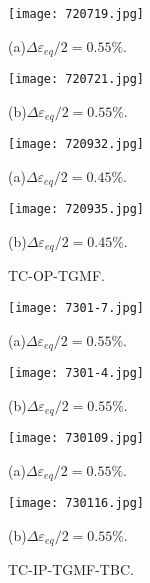 \begin{figure}
  \begin{minipage}[t]{0.5\linewidth}
  \nonumber
    \centering
    \texttt{[image: 720719.jpg]}
    \centerline{(a)$\Delta \varepsilon_{eq}/2=0.55\%$.}
  \end{minipage}%
  \begin{minipage}[t]{0.5\linewidth}
    \centering
    \texttt{[image: 720721.jpg]}
    \centerline{(b)$\Delta \varepsilon_{eq}/2=0.55\%$.}
  \end{minipage}
  
  \begin{minipage}[t]{0.5\linewidth}
  \nonumber
    \centering
    \texttt{[image: 720932.jpg]}
    \centerline{(a)$\Delta \varepsilon_{eq}/2=0.45\%$.}
  \end{minipage}%
  \begin{minipage}[t]{0.5\linewidth}
    \centering
    \texttt{[image: 720935.jpg]}
    \centerline{(b)$\Delta \varepsilon_{eq}/2=0.45\%$.}
  \end{minipage}
  
  \caption{TC-OP-TGMF.}
  \label{Fig:MicrostructureofInconel718}
\end{figure}

\begin{figure}
  \begin{minipage}[t]{0.5\linewidth}
  \nonumber
    \centering
    \texttt{[image: 7301-7.jpg]}
    \centerline{(a)$\Delta \varepsilon_{eq}/2=0.55\%$.}
  \end{minipage}%
  \begin{minipage}[t]{0.5\linewidth}
    \centering
    \texttt{[image: 7301-4.jpg]}
    \centerline{(b)$\Delta \varepsilon_{eq}/2=0.55\%$.}
  \end{minipage}
  
  \begin{minipage}[t]{0.5\linewidth}
  \nonumber
    \centering
    \texttt{[image: 730109.jpg]}
    \centerline{(a)$\Delta \varepsilon_{eq}/2=0.55\%$.}
  \end{minipage}%
  \begin{minipage}[t]{0.5\linewidth}
    \centering
    \texttt{[image: 730116.jpg]}
    \centerline{(b)$\Delta \varepsilon_{eq}/2=0.55\%$.}
  \end{minipage}
  
  \caption{TC-IP-TGMF-TBC.}
  \label{Fig:MicrostructureofInconel718}
\end{figure}

